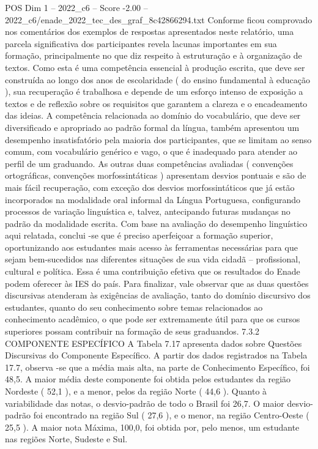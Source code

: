 \begin{textsample}{POS Dim 1 – 2022\_c6 – Score -2.00 – 2022\_c6/enade\_2022\_tec\_des\_graf\_8c42866294.txt}
Conforme ficou comprovado nos comentários dos exemplos de respostas apresentados neste relatório, uma parcela significativa dos participantes revela lacunas importantes em sua formação, principalmente no que diz respeito à estruturação e à organização de textos.
Como esta é uma competência essencial à produção escrita, que deve ser construída ao longo dos anos de escolaridade ( do ensino fundamental à educação ), sua recuperação é trabalhosa e depende de um esforço intenso de exposição a textos e de reflexão sobre os requisitos que garantem a clareza e o encadeamento das ideias.
A competência relacionada ao domínio do vocabulário, que deve ser diversificado e apropriado ao padrão formal da língua, também apresentou um desempenho insatisfatório pela maioria dos participantes, que se limitam ao senso comum, com vocabulário genérico e vago, o que é inadequado para atender ao perfil de um graduando.
As outras duas competências avaliadas ( convenções ortográficas, convenções morfossintáticas ) apresentam desvios pontuais e são de mais fácil recuperação, com exceção dos desvios morfossintáticos que já estão incorporados na modalidade oral informal da Língua Portuguesa, configurando processos de variação linguística e, talvez, antecipando futuras mudanças no padrão da modalidade escrita.
Com base na avaliação do desempenho linguístico aqui relatada, conclui -se que é preciso aperfeiçoar a formação superior, oportunizando aos estudantes mais acesso às ferramentas necessárias para que sejam bem-sucedidos nas diferentes situações de sua vida cidadã – profissional, cultural e política.
Essa é uma contribuição efetiva que os resultados do Enade podem oferecer às IES do país.
Para finalizar, vale observar que as duas questões discursivas atenderam às exigências de avaliação, tanto do domínio discursivo dos estudantes, quanto do seu conhecimento sobre temas relacionados ao conhecimento acadêmico, o que pode ser extremamente útil para que os cursos superiores possam contribuir na formação de seus graduandos. 7.3.2 COMPONENTE ESPECÍFICO A Tabela 7.17 apresenta dados sobre Questões Discursivas do Componente Específico.
A partir dos dados registrados na Tabela 17.7, observa -se que a média mais alta, na parte de Conhecimento Específico, foi 48,5.
A maior média deste componente foi obtida pelos estudantes da região Nordeste ( 52,1 ), e a menor, pelos da região Norte ( 44,6 ).
Quanto à variabilidade das notas, o desvio-padrão de todo o Brasil foi 26,7.
O maior desvio-padrão foi encontrado na região Sul ( 27,6 ), e o menor, na região Centro-Oeste ( 25,5 ).
A maior nota Máxima, 100,0, foi obtida por, pelo menos, um estudante nas regiões Norte, Sudeste e Sul.

\end{textsample}
